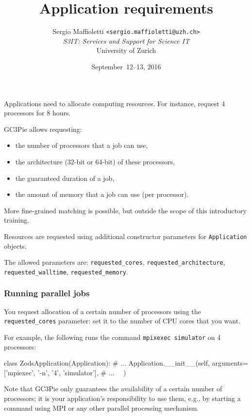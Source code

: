 \documentclass[english,serif,mathserif,xcolor=pdftex,dvipsnames,table]{beamer}
\title[Requirements]{%
  Application requirements
}
\author[S. Maffioletti, S3IT UZH]{%
  Sergio Maffioletti \texttt{<sergio.maffioletti@uzh.ch>}
  \\[1ex]
  \emph{S3IT: Services and Support for Science IT}
  \\[1ex]
  University of Zurich
}
\date{September~12--13, 2016}
\begin{document}
\maketitle


\begin{frame}
  Applications need to allocate computing resources.
  For instance, request 4 processors for 8 hours.

  \+
  GC3Pie allows requesting:
  \begin{itemize}
  \item the number of processors that a job can use,
  \item the architecture (32-bit or 64-bit) of these processors,
  \item the guaranteed duration of a job,
  \item the amount of memory that a job can use (per processor).
  \end{itemize}

  \+
  More fine-grained matching is possible, but outside the scope of
  this introductory training.
\end{frame}


\begin{frame}[fragile]
  Resources are requested using additional constructor parameters for
  \texttt{Application} objects.

  \+
  The allowed parameters are:
  \lstinline|requested_cores|,
  \lstinline|requested_architecture|,
  \lstinline|requested_walltime|,
  \lstinline|requested_memory|.
\end{frame}


\begin{frame}[fragile]
  \frametitle{Running parallel jobs}

  You request allocation of a certain number of processors using the
  \lstinline|requested_cores| parameter: set it to the number of CPU
  cores that you want.

  \+
  For example, the following runs the command \texttt{mpixexec
    simulator} on 4 processors:
  \begin{python}
  class ZodsApplication(Application):
    # ...
    Application.__init__(self,
      arguments=['mpiexec', '-n', '4', 'simulator'],
      # ...
      ~~)
  \end{python}

  \+
  {\small Note that GC3Pie only guarantees the availability of a certain
    number of processors; it is your application's responsibility to use
    them, e.g., by starting a command using MPI or any other parallel
    processing mechanism.}
\end{frame}
\end{document}
